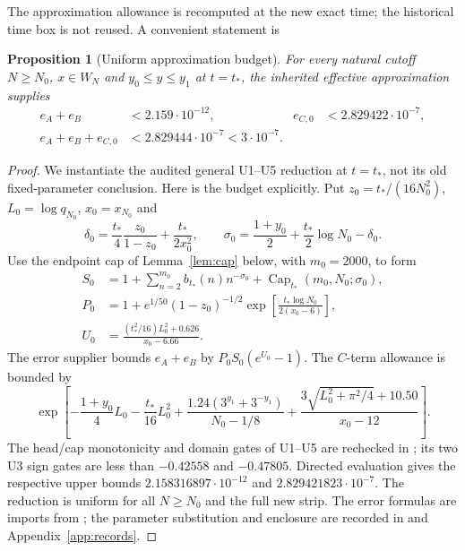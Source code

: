 \documentclass[11pt]{article}
\newtheorem{proposition}[theorem]{Proposition}
\theoremstyle{remark}
\newcommand{\tstar}{t_*}
\newcommand{\Nzero}{N_0}
\DeclareMathOperator{\Capbd}{Cap}
\numberwithin{equation}{section}
\begin{document}
The approximation allowance is recomputed at the new exact time; the
historical time box is not reused. A convenient statement is
\begin{proposition}[Uniform approximation budget]\label{prop:error}
For every natural cutoff $N\ge\Nzero$, $x\in W_N$ and
$y_0\le y\le y_1$ at $t=\tstar$, the inherited effective approximation
supplies
\begin{align*}
 e_A+e_B&<2.159\cdot10^{-12},&
 e_{C,0}&<2.829422\cdot10^{-7},\\
 e_A+e_B+e_{C,0}&<2.829444\cdot10^{-7}<3\cdot10^{-7}.
\end{align*}
\end{proposition}
\begin{proof}
We instantiate the audited general U1--U5 reduction \cite[Section 4]{audit4}
at $t=\tstar$, not its old fixed-parameter conclusion. Here is the
budget explicitly. Put $z_0=\tstar/(16\Nzero^2)$, $L_0=\log q_{\Nzero}$,
$x_0=x_{\Nzero}$ and
\[
 \delta_0=\frac{\tstar}{4}\frac{z_0}{1-z_0}
       +\frac{\tstar}{2x_0^2},\qquad
 \sigma_0=\frac{1+y_0}{2}+\frac{\tstar}{2}\log\Nzero-\delta_0.
\]
Use the endpoint cap of Lemma~\ref{lem:cap} below, with $m_0=2000$, to form
\begin{align*}
 S_0&=1+\sum_{n=2}^{m_0}b_{\tstar}(n)n^{-\sigma_0}
        +\Capbd_{\tstar}(m_0,\Nzero;\sigma_0),\\
 P_0&=1+e^{1/50}(1-z_0)^{-1/2}
        \exp\!\left[\frac{\tstar\log\Nzero}{2(x_0-6)}\right],\\
 U_0&=\frac{(\tstar^2/16)L_0^2+0.626}{x_0-6.66}.
\end{align*}
The error supplier bounds $e_A+e_B$ by $P_0S_0(e^{U_0}-1)$. The
$C$-term allowance is bounded by
\begin{equation}\label{eq:eCbudget}
 \exp\!\left[-\frac{1+y_0}{4}L_0-\frac{\tstar}{16}L_0^2
 +\frac{1.24(3^{y_1}+3^{-y_1})}{\Nzero-1/8}
 +\frac{3\sqrt{L_0^2+\pi^2/4}+10.50}{x_0-12}\right].
\end{equation}
The head/cap monotonicity and domain gates of U1--U5 are rechecked in
; its two U3 sign gates are
less than $-0.42558$ and $-0.47805$. Directed evaluation gives the
respective upper bounds $2.158316897\cdot10^{-12}$ and
$2.829421823\cdot10^{-7}$. The reduction is uniform for all $N\ge\Nzero$
and the full new strip. The error formulas are imports from
\cite{polymath,audit4}; the parameter substitution and enclosure are
recorded in \cite{note01} and Appendix~\ref{app:records}.
\end{proof}
\end{document}
